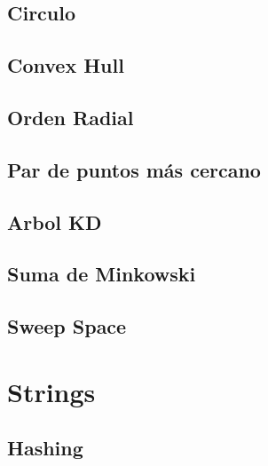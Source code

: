 \documentclass[a4paper,11pt,landscape,twocolumn]{article}
\begin{document}
\subsection{Circulo}



\subsection{Convex Hull}



\subsection{Orden Radial}



\subsection{Par de puntos más cercano}



\subsection{Arbol KD}



\subsection{Suma de Minkowski}



\subsection{Sweep Space}



\section{Strings}

\subsection{Hashing}
\end{document}
